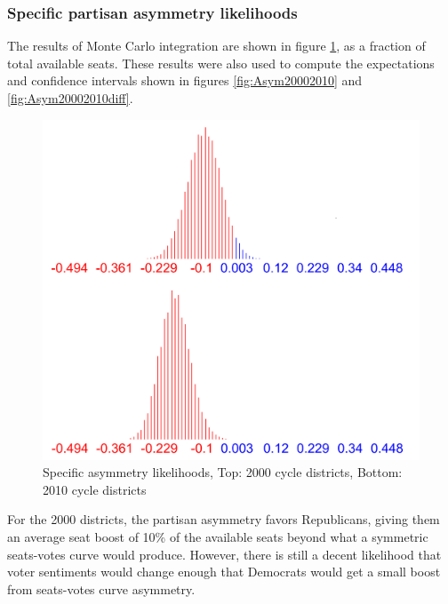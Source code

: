 \documentclass[preprint,12pt]{article}
\begin{document}
\subsubsection{Specific partisan asymmetry likelihoods}
 
The results of Monte Carlo integration are shown in figure \ref{fig:LikelihoodsAsymmetry}, as a fraction of total available seats.  
These results were also used to compute the expectations and confidence intervals shown in figures \ref{fig:Asym20002010} and \ref{fig:Asym20002010diff}.
 
\begin{figure}[htb!]
    \begin{center}
        \includegraphics[scale=0.25]{../Figures/WI_compared/asymmetry_cropped.png}
        \caption{Specific asymmetry likelihoods, Top: 2000 cycle districts, Bottom: 2010 cycle districts}\label{fig:LikelihoodsAsymmetry}
    \end{center}
\end{figure}
 
For the 2000 districts, the partisan asymmetry favors Republicans, giving them an average seat boost of 10\% of the available seats beyond what a symmetric seats-votes curve would produce.  
However, there is still a decent likelihood that voter sentiments would change enough that Democrats would get a small boost from seats-votes curve asymmetry.
\end{document}
